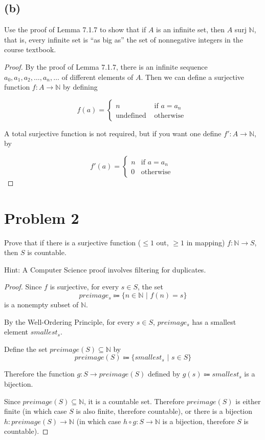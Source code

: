 \documentclass[14pt]{extarticle}
\begin{document}
\subsection{(b)}
Use the proof of Lemma 7.1.7 to show that if $A$ is an infinite set, then $A$ surj $\mathbb{N}$, that is, every infinite set is “as big as” the set of nonnegative integers in the course textbook.
\begin{proof}
By the proof of Lemma 7.1.7, there is an infinite sequence $a_0, a_1, a_2, \ldots, a_n, \ldots$ of differ­ent elements of $A$. Then we can define a surjective function $f: A \to \mathbb{N}$ by defining

\begin{displaymath}
   f(a) = \left\{
     \begin{array}{lr}
       n & \text{ if } a = a_n\\
       \text{undefined} & \text{ otherwise }
     \end{array}
   \right.
\end{displaymath}

A total surjective function is not required, but if you want one define $f': A \to \mathbb{N}$, by

\begin{displaymath}
   f'(a) = \left\{
     \begin{array}{lr}
       n & \text{if } a = a_n\\
       0 & \text{otherwise }
     \end{array}
   \right.
\end{displaymath}
\end{proof}

\section{Problem 2}
Prove that if there is a surjective function ($\leq 1$ out, $\geq 1$ in mapping) $f:\mathbb{N}\to S$, then $S$ is countable.

Hint: A Computer Science proof involves filtering for duplicates.

\begin{proof}
Since $f$ is surjective, for every $s \in S$, the set 
$$
preimage_s \Coloneqq \{n \in \mathbb{N} \,\,|\,\, f(n) = s\}
$$ 
is a nonempty subset of $\mathbb{N}$.

By the Well-Ordering Principle, for every $s \in S$, $preimage_s$ has a smallest element $smallest_s$.

Define the set $preimage(S) \subseteq \mathbb{N}$ by
$$
preimage(S) \Coloneqq \{smallest_s \,\, | \,\, s \in S\}
$$

Therefore the function $g: S \to preimage(S)$ defined by $g(s) \Coloneqq smallest_s$ is a bijection.

Since $preimage(S) \subseteq \mathbb{N}$, it is a countable set. Therefore $preimage(S)$ is either finite (in which case $S$ is also finite, therefore countable), or there is a bijection $h : preimage(S) \to \mathbb{N}$ (in which case $h \circ g : S \to \mathbb{N}$ is a bijection, therefore $S$ is countable).
\end{proof}
\end{document}

